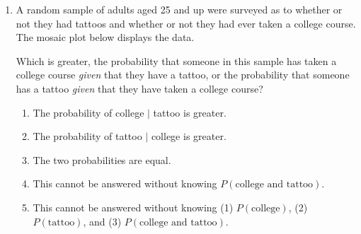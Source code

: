 \documentclass{article}
\begin{document}
\begin{enumerate}[label=\textbf{S\arabic*.}]
\item A random sample of adults aged 25 and up were surveyed as to whether or not
they had tattoos and whether or not they had ever taken a college course.
The mosaic plot below displays the data.

\begin{center}
\end{center}

Which is greater, the probability that someone in this sample has taken a college
course \emph{given} that they have a tattoo, or the probability that someone has
a tattoo \emph{given} that they have taken a college course?
\begin{enumerate}
  \item The probability of college $\mid$ tattoo is greater.
  \item The probability of tattoo $\mid$ college is greater.
  \item The two probabilities are equal.
  \item This cannot be answered without knowing $P(\text{college and tattoo})$.
  \item This cannot be answered without knowing
        (1) $P(\text{college})$, (2) $P(\text{tattoo})$, and
        (3) $P(\text{college and tattoo})$.
\end{enumerate}


\end{enumerate}
\end{document}
